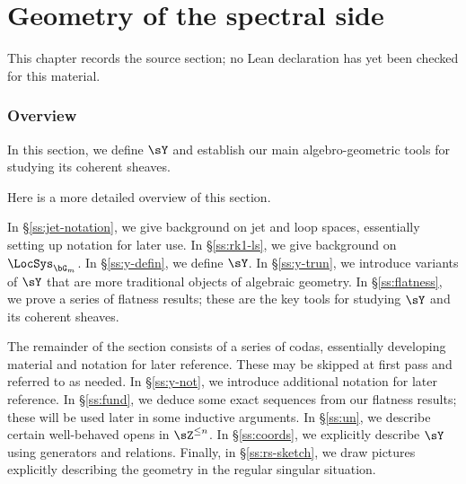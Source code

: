 \chapter{Geometry of the spectral side}
\label{tates-thesis-de-rham-setting-chapter-02}

\begin{remark}
\label{tates-thesis-de-rham-setting-chapter-02-source}
This chapter records the source section; no Lean declaration has yet been checked for this material.
\notready
\end{remark}

\label{s:spectral}

\subsection{Overview}

In this section, we define $\sY$ and establish our main algebro-geometric tools
for studying its coherent sheaves.

Here is a more detailed overview of this section.

In \S \ref{ss:jet-notation}, we give background on jet and loop spaces,
essentially setting up notation for later use.
In \S \ref{ss:rk1-ls}, we give background on $\LocSys_{\bG_m}$.
In \S \ref{ss:y-defin}, we define $\sY$. In \S \ref{ss:y-trun},
we introduce variants of $\sY$ that are more traditional objects
of algebraic geometry. In \S \ref{ss:flatness}, we prove a series
of flatness results; these are the key tools for studying $\sY$ and
its coherent sheaves.

The remainder of the section consists of a series of codas, essentially
developing material and notation for later reference. These may be skipped
at first pass and referred to as needed. In \S \ref{ss:y-not}, we introduce
additional notation for later reference. In \S \ref{ss:fund}, we deduce
some exact sequences from our flatness results; these will be used
later in some inductive arguments. In \S \ref{ss:un}, we describe
certain well-behaved opens in $\sZ^{\leq n}$.
In \S \ref{ss:coords}, we explicitly describe $\sY$ using
generators and relations. Finally, in \S \ref{ss:rs-sketch}, we draw pictures
explicitly describing the geometry in the regular singular situation.

